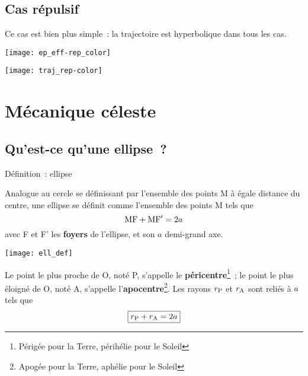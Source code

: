 \documentclass[../main/main.tex]{subfiles}
\begin{document}
\subsection{Cas répulsif}
Ce cas est bien plus simple~: la trajectoire est hyperbolique dans tous les cas.
\smallbreak
\begin{minipage}[c]{0.48\linewidth}
    \begin{center}
        \texttt{[image: ep\_eff-rep\_color]}
    \end{center}
\end{minipage}
\hfill
\begin{minipage}[c]{0.48\linewidth}
    \begin{center}
        \texttt{[image: traj\_rep-color]}
    \end{center}
\end{minipage}

\section{Mécanique céleste}
\subsection{Qu'est-ce qu'une ellipse~?}
\begin{tdefi}{Définition~: ellipse}
    \begin{minipage}{0.45\linewidth}
        Analogue au cercle se définissant par l'ensemble des points M à égale
        distance du centre, une ellipse se définit comme l'ensemble des points M
        tels que
        \[{\rm MF}+{\rm MF'} = 2a\]
        avec F et F' les \textbf{foyers} de l'ellipse, et son $a$ demi-grand axe.
    \end{minipage}
    \hfill
    \begin{minipage}{0.45\linewidth}
        \begin{center}
            \texttt{[image: ell\_def]}
        \end{center}
    \end{minipage} \smallbreak
    Le point le plus proche de O, noté P, s'appelle le
    \textbf{péricentre}\footnote{Périgée pour la Terre, périhélie pour le
    Soleil}~; le point le plus éloigné de O, noté A, s'appelle
    l'\textbf{apocentre}\footnote{Apogée pour la Terre, aphélie pour le Soleil}.
    Les rayons $r_{\rm P}$ et $r_{\rm A}$ sont reliés à $a$ tels que
    \[\boxed{r_{\rm P} + r_{\rm A} = 2a}\]
\end{tdefi}
\end{document}
